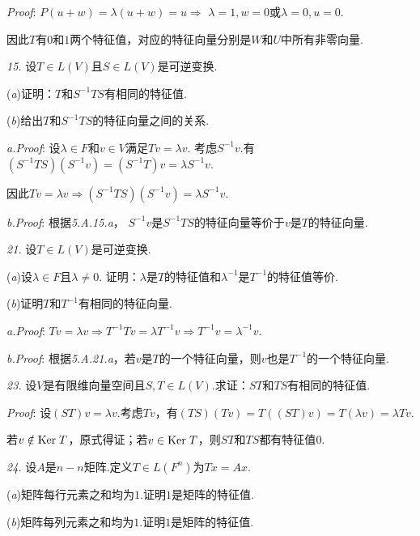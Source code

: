 \textit{Proof}:
\(P(u+w)=\lambda(u+w)=u \Rightarrow\) \(\lambda=1,w=0\)或\(\lambda=0,u=0\).

因此\(T\)有\(0\)和\(1\)两个特征值，对应的特征向量分别是\(W\)和\(U\)中所有非零向量.

\hspace*{\fill}

\textit{15.}
设\(T \in L(V)\)且\(S \in L(V)\)是可逆变换.

(\textit{a})证明：\(T\)和\(S^{-1}TS\)有相同的特征值.

(\textit{b})给出\(T\)和\(S^{-1}TS\)的特征向量之间的关系.

\textit{a.Proof}:
设\(\lambda \in F\)和\(v \in V\)满足\(Tv=\lambda v\).
考虑\(S^{-1}v\).有\((S^{-1}TS)(S^{-1}v)=(S^{-1}T)v=\lambda S^{-1}v\).

因此\(Tv=\lambda v \Rightarrow (S^{-1}TS)(S^{-1}v)=\lambda S^{-1}v\).

\textit{b.Proof}:
根据\textit{5.A.15.a}，
\(S^{-1}v\)是\(S^{-1}TS\)的特征向量等价于\(v\)是\(T\)的特征向量.

\hspace*{\fill}

\textit{21.}
设\(T \in L(V)\)是可逆变换.

(\textit{a})设\(\lambda \in F\)且\(\lambda \ne 0\).
证明：\(\lambda\)是\(T\)的特征值和\(\lambda^{-1}\)是\(T^{-1}\)的特征值等价.

(\textit{b})证明\(T\)和\(T^{-1}\)有相同的特征向量.

\textit{a.Proof}:
\(Tv=\lambda v \Rightarrow T^{-1}Tv=\lambda T^{-1}v \Rightarrow T^{-1}v=\lambda^{-1} v\).

\textit{b.Proof}:
根据\textit{5.A.21.a}，若\(v\)是\(T\)的一个特征向量，则\(v\)也是\(T^{-1}\)的一个特征向量.

\newpage

\textit{23.}
设\(V\)是有限维向量空间且\(S,T \in L(V)\).求证：\(ST\)和\(TS\)有相同的特征值.

\textit{Proof}:
设\((ST)v=\lambda v\).考虑\(Tv\)，有\((TS)(Tv)=T((ST)v)=T(\lambda v)=\lambda Tv\).

若\(v \notin \mathrm{Ker \;} T\)，原式得证；若\(v \in \mathrm{Ker \;} T\)，则\(ST\)和\(TS\)都有特征值\(0\).

\hspace*{\fill}

\textit{24.}
设\(A\)是\(n-n\)矩阵.定义\(T \in L(F^n)\)为\(Tx=Ax\).

(\textit{a})矩阵每行元素之和均为\(1\).证明\(1\)是矩阵的特征值.

(\textit{b})矩阵每列元素之和均为\(1\).证明\(1\)是矩阵的特征值.

